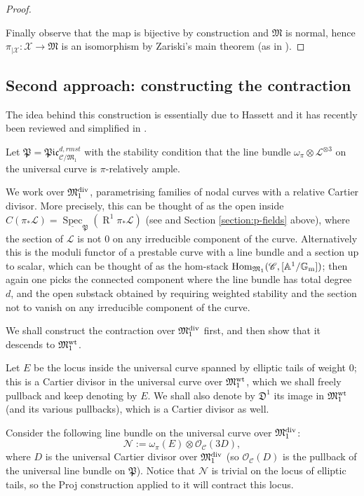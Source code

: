 \documentclass[11pt]{amsart}
\renewcommand{\to}{\rightarrow}
\newcommand{\Aaff}{\mathbb A}
\newcommand{\cC}{\mathcal C}
\newcommand{\MM}{\mathfrak M}
\newcommand{\pP}{\mathfrak P}
\newcommand{\R}{\operatorname{R}}
\newcommand{\Gm}{\mathbb{G}_{\rm{m}}}
\newcommand{\Spec}{\underline{\operatorname{Spec}}}
\newcommand{\Hom}{\operatorname{Hom}}
\theoremstyle{plain}
\theoremstyle{definition}
\begin{document}
\begin{proof}
\begin{enumerate}[label=(\alph*)]
\end{enumerate}
Finally observe that the map is bijective by construction and $\MM$ is normal, hence $\pi_{|\mathcal X}\colon\mathcal X\to \MM$ is an isomorphism by Zariski's main theorem (as in \cite[\href{http://stacks.math.columbia.edu/tag/082I}{Tag 082I}]{stacks-project}).
 \end{proof}
 
\subsection{Second approach: constructing the contraction}

The idea behind this construction is essentially due to Hassett \cite[\S2]{HassettHyeon} and it has recently been reviewed and simplified in \cite[\S3.7]{RSPW}.

Let $\mathfrak{P}=\mathfrak{Pic}^{d,rm{st}}_{\cC/\MM_1}$ with the stability condition that the line bundle $\omega_\pi\otimes \mathcal L^{\otimes 3}$ on the universal curve is $\pi$-relatively ample. 

We work over $\MM_1^{\rm{div}}$, parametrising families of nodal curves with a relative Cartier divisor. More precisely, this can be thought of as the open inside $C(\pi_*\mathcal L)=\Spec_\pP(\R^1\pi_*\mathcal L)$ (see \cite{CLpfields} and Section \ref{section:p-fields} above), where the section of $\mathcal L$ is not $0$ on any irreducible component of the curve. Alternatively this is the moduli functor of a prestable curve with a line bundle and a section up to scalar, which can be thought of as the hom-stack $\Hom_{\MM_1}(\cC,[\Aaff^1/\Gm])$; then again one picks the connected component where the line bundle has total degree $d$, and the open substack obtained by requiring weighted stability and the section not to vanish on any irreducible component of the curve.

We shall construct the contraction over $\MM_1^{\rm{div}}$ first, and then show that it descends to $\MM_1^{\rm{wt}}$.

Let $E$ be the locus inside the universal curve spanned by elliptic tails of weight $0$; this is a Cartier divisor in the universal curve over $\MM^{\rm{wt}}_1$, which we shall freely pullback and keep denoting by $E$. We shall also denote by $\mathfrak D^1$ its image in $\MM^{\rm{wt}}_1$ (and its various pullbacks), which is a Cartier divisor as well.

Consider the following line bundle on the universal curve over $\MM_1^{\rm{div}}$: 
\begin{equation}\label{eq:linebundlecontraction}
\mathcal N:=\omega_{\pi}(E)\otimes\mathcal O_{\cC}(3D),
\end{equation} where $D$ is the universal Cartier divisor over $\MM_1^{\rm{div}}$ (so $\mathcal O_{\cC}(D)$ is the pullback of the universal line bundle on $\pP$).
Notice that $\mathcal N$ is trivial on the locus of elliptic tails, so the Proj construction applied to it will contract this locus.
\end{document}
